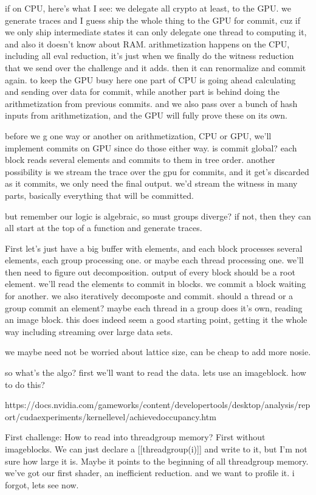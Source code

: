 if on CPU, here's what I see:
we delegate all crypto at least, to the GPU.
we generate traces and I guess ship the whole thing to the GPU for commit, cuz if we only ship intermediate states it can only delegate one thread to computing it, and also it doesn't know about RAM.
arithmetization happens on the CPU, including all eval reduction, it's just when we finally do the witness reduction that we send over the challenge and it adds. then it can renormalize and commit again.
to keep the GPU busy here one part of CPU is going ahead calculating and sending over data for commit, while another part is behind doing the arithmetization from previous commits. 
and we also pass over a bunch of hash inputs from arithmetization, and the GPU will fully prove these on its own. 

before we g one way or another on arithmetization, CPU or GPU, we'll implement commits on GPU since do those either way.
is commit global? each block reads several elements and commits to them in tree order. 
another possibility is we stream the trace over the gpu for commits, and it get's discarded as it commits, we only need the final output. we'd stream the witness in many parts, basically everything that will be committed.

but remember our logic is algebraic, so must groups diverge?
if not, then they can all start at the top of a function and generate traces. 

First let's just have a big buffer with elements, and each block processes several elements, each group processing one. or maybe each thread processing one. we'll then need to figure out decomposition. output of every block should be a root element.
we'll read the elements to commit in blocks. we commit a block waiting for another. we also iteratively decomposte and commit. 
should a thread or a group commit an element? maybe each thread in a group does it's own, reading an image block. 
this does indeed seem a good starting point, getting it the whole way including streaming over large data sets. 

we maybe need not be worried about lattice size, can be cheap to add more nosie. 

so what's the algo?
first we'll want to read the data. lets use an imageblock.
how to do this?

https://docs.nvidia.com/gameworks/content/developertools/desktop/analysis/report/cudaexperiments/kernellevel/achievedoccupancy.htm

First challenge:
How to read into threadgroup memory? First without imageblocks. 
We can just declare a [[threadgroup(i)]] and write to it, but I'm not sure how large it is. Maybe it points to the beginning of all threadgroup memory. 
we've got our first shader, an inefficient reduction. and we want to profile it. 
i forgot, lets see now. 


